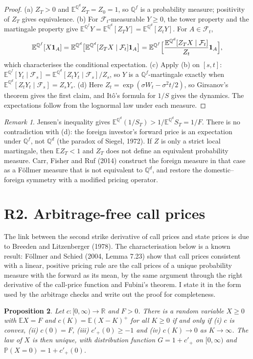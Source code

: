 \documentclass[11pt]{article}
\newtheorem{proposition}{Proposition}
\theoremstyle{remark}
\newtheorem{remark}[proposition]{Remark}
\newcommand{\E}{\mathbb{E}}
\newcommand{\Q}{\mathbb{Q}}
\renewcommand{\P}{\mathbb{P}}
\begin{document}
\begin{proof}
(a) $Z_T>0$ and $\E^{\Q^d}Z_T=Z_0=1$, so $\Q^f$ is a probability measure; positivity of $Z_T$ gives equivalence. (b) For $\mathcal F_t$-measurable $Y\ge0$, the tower property and the martingale property give $\E^{\Q^f}Y=\E^{\Q^d}[Z_TY]=\E^{\Q^d}[Z_tY]$. For $A\in\mathcal F_t$,
\[
\E^{\Q^f}[X\mathbf 1_A]=\E^{\Q^d}\bigl[\E^{\Q^d}[Z_TX\mid\mathcal F_t]\mathbf 1_A\bigr]=\E^{\Q^f}\Bigl[\frac{\E^{\Q^d}[Z_TX\mid\mathcal F_t]}{Z_t}\mathbf 1_A\Bigr],
\]
which characterises the conditional expectation. (c) Apply (b) on $[s,t]$: $\E^{\Q^f}[Y_t\mid\mathcal F_s]=\E^{\Q^d}[Z_tY_t\mid\mathcal F_s]/Z_s$, so $Y$ is a $\Q^f$-martingale exactly when $\E^{\Q^d}[Z_tY_t\mid\mathcal F_s]=Z_sY_s$. (d) Here $Z_t=\exp(\sigma W_t-\sigma^2t/2)$, so Girsanov's theorem gives the first claim, and It\^o's formula for $1/S$ gives the dynamics. The expectations follow from the lognormal law under each measure.
\end{proof}

\begin{remark}
Jensen's inequality gives $\E^{\Q^d}(1/S_T)>1/\E^{\Q^d}S_T=1/F$. There is no contradiction with (d): the foreign investor's forward price is an expectation under $\Q^f$, not $\Q^d$ (the paradox of Siegel, 1972). If $Z$ is only a strict local martingale, then $\E Z_T<1$ and $Z_T$ does not define an equivalent probability measure. Carr, Fisher and Ruf (2014) construct the foreign measure in that case as a F\"ollmer measure that is not equivalent to $\Q^d$, and restore the domestic--foreign symmetry with a modified pricing operator.
\end{remark}

\section*{R2. Arbitrage-free call prices}

The link between the second strike derivative of call prices and state prices is due to Breeden and Litzenberger (1978). The characterisation below is a known result: F\"ollmer and Schied (2004, Lemma 7.23) show that call prices consistent with a linear, positive pricing rule are the call prices of a unique probability measure with the forward as its mean, by the same argument through the right derivative of the call-price function and Fubini's theorem. I state it in the form used by the arbitrage checks and write out the proof for completeness.

\begin{proposition}
Let $c:[0,\infty)\to\mathbb{R}$ and $F>0$. There is a random variable $X\ge 0$ with $\E X=F$ and $c(K)=\E(X-K)^+$ for all $K\ge0$ if and only if (i) $c$ is convex, (ii) $c(0)=F$, (iii) $c'_+(0)\ge -1$ and (iv) $c(K)\to0$ as $K\to\infty$. The law of $X$ is then unique, with distribution function $G=1+c'_+$ on $[0,\infty)$ and $\P(X=0)=1+c'_+(0)$.
\end{proposition}
\end{document}
